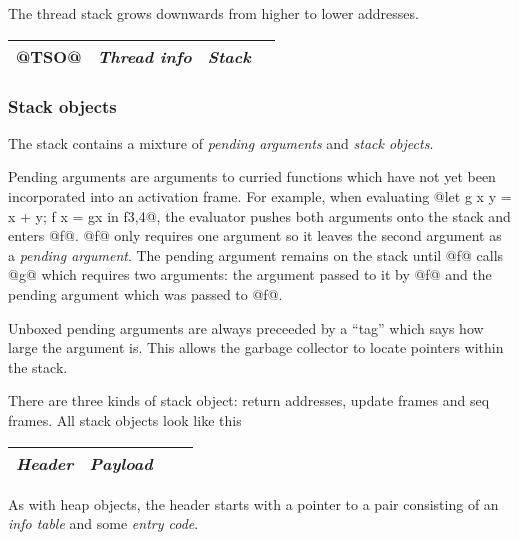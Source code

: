 \documentclass[11pt]{article}
\newcommand{\Subsubsection}[2]{\subsubsection{#1}\label{sec:#2}}
\begin{document}
\begin{description}
The thread stack grows downwards from higher to lower addresses.

\begin{center}
\begin{tabular}{|l|l|l|l|}\hline
@TSO@ & \emph{Thread info} & \emph{Stack} \\ \hline
\end{tabular}
\end{center}

\end{description}

\Subsubsection{Stack objects}{stack-objects-overview}

The stack contains a mixture of \emph{pending arguments} and 
\emph{stack objects}.

Pending arguments are arguments to curried functions which have not
yet been incorporated into an activation frame.  For example, when
evaluating @let { g x y = x + y; f x = g{x} } in f{3,4}@, the
evaluator pushes both arguments onto the stack and enters @f@.  @f@
only requires one argument so it leaves the second argument as a
\emph{pending argument}.  The pending argument remains on the stack
until @f@ calls @g@ which requires two arguments: the argument passed
to it by @f@ and the pending argument which was passed to @f@.

Unboxed pending arguments are always preceeded by a ``tag'' which says
how large the argument is.  This allows the garbage collector to
locate pointers within the stack.

There are three kinds of stack object: return addresses, update frames
and seq frames.  All stack objects look like this

\begin{center}
\begin{tabular}{|l|l|l|l|}\hline
\emph{Header} & \emph{Payload} \\ \hline
\end{tabular}
\end{center}

As with heap objects, the header starts with a pointer to a pair
consisting of an \emph{info table} and some \emph{entry code}.
\end{document}
